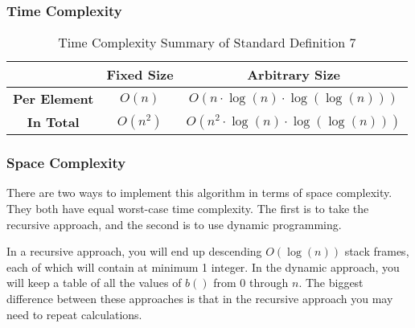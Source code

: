 \documentclass[conference]{IEEEtran}
\begin{document}
\subsubsection{Time Complexity}


\renewcommand{\arraystretch}{1.25}
\begin{table}[H]
    \centering
    \caption{Time Complexity Summary of Standard Definition 7}
    \begin{tabular}{|c|c|c|}
        \hline
        & \textbf{Fixed Size} & \textbf{Arbitrary Size} \\
        \hline
        \textbf{Per Element} & $O(n)$ & $O(n \cdot \log(n) \cdot \log(\log(n)))$ \\
        \hline
        \textbf{In Total} & $O\left(n^2\right)$ & $O\left(n^2 \cdot \log(n) \cdot \log(\log(n))\right)$ \\
        \hline
    \end{tabular}
    \label{tab:time_p2_d07}
\end{table}

\subsubsection{Space Complexity}

There are two ways to implement this algorithm in terms of space complexity. They both have equal worst-case time complexity. The first is to take the recursive approach, and the second is to use dynamic programming.

In a recursive approach, you will end up descending $O(\log(n))$ stack frames, each of which will contain at minimum 1 integer. In the dynamic approach, you will keep a table of all the values of $b()$ from $0$ through $n$. The biggest difference between these approaches is that in the recursive approach you may need to repeat calculations.
\end{document}
